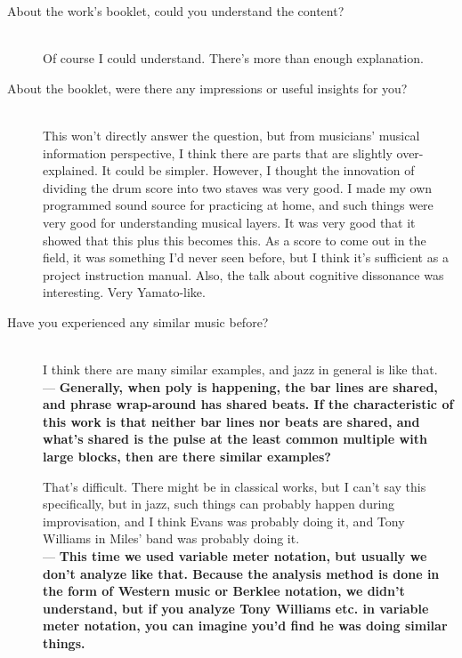 \begin{description}
\item [About the work's booklet, could you understand the content?]\mbox{}\\

Of course I could understand. There's more than enough explanation.\\

\item [About the booklet, were there any impressions or useful insights for you?]\mbox{}\\

This won't directly answer the question, but from musicians' musical information perspective, I think there are parts that are slightly over-explained. It could be simpler. However, I thought the innovation of dividing the drum score into two staves was very good. I made my own programmed sound source for practicing at home, and such things were very good for understanding musical layers. It was very good that it showed that this plus this becomes this. As a score to come out in the field, it was something I'd never seen before, but I think it's sufficient as a project instruction manual. Also, the talk about cognitive dissonance was interesting. Very Yamato-like.\\

\item [Have you experienced any similar music before?]\mbox{}\\

I think there are many similar examples, and jazz in general is like that.\\

--- {\bf Generally, when poly is happening, the bar lines are shared, and phrase wrap-around has shared beats. If the characteristic of this work is that neither bar lines nor beats are shared, and what's shared is the pulse at the least common multiple with large blocks, then are there similar examples?}

That's difficult. There might be in classical works, but I can't say this specifically, but in jazz, such things can probably happen during improvisation, and I think Evans was probably doing it, and Tony Williams in Miles' band was probably doing it.\\

--- {\bf This time we used variable meter notation, but usually we don't analyze like that. Because the analysis method is done in the form of Western music or Berklee notation, we didn't understand, but if you analyze Tony Williams etc. in variable meter notation, you can imagine you'd find he was doing similar things.}


\end{description}
